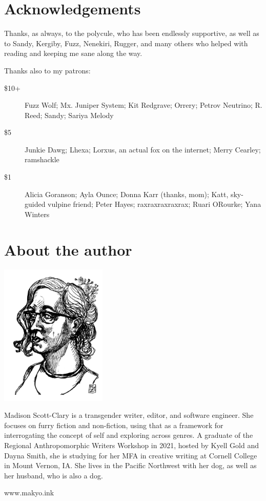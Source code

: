 \chapter*{Acknowledgements}

Thanks, as always, to the polycule, who has been endlessly supportive, as well as to Sandy, Kergiby, Fuzz, Nenekiri, Rugger, and many others who helped with reading and keeping me sane along the way.

Thanks also to my patrons:

\begin{description}
    \item[\$10+]
    Fuzz Wolf; Mx. Juniper System; Kit Redgrave; Orrery; Petrov Neutrino; R. Reed; Sandy; Sariya Melody

    \item[\$5]
    Junkie Dawg; Lhexa; Lorxus, an actual fox on the internet; Merry Cearley; ramshackle

    \item[\$1]
    Alicia Goranson; Ayla Ounce; Donna Karr (thanks, mom); Katt, sky-guided vulpine friend; Peter Hayes; raxraxraxraxrax; Ruari ORourke; Yana Winters
\end{description}

\chapter*{About the author}

\begin{center}
  \includegraphics[width=2in]{content/headshot.png}
\end{center}

\noindent Madison Scott-Clary is a transgender writer, editor, and software engineer. She focuses on furry fiction and non-fiction, using that as a framework for interrogating the concept of self and exploring across genres. A graduate of the Regional Anthropomorphic Writers Workshop in 2021, hosted by Kyell Gold and Dayna Smith, she is studying for her MFA in creative writing at Cornell College in Mount Vernon, IA. She lives in the Pacific Northwest with her dog, as well as her husband, who is also a dog.

\begin{center}
    www.makyo.ink
\end{center}

\vfill
